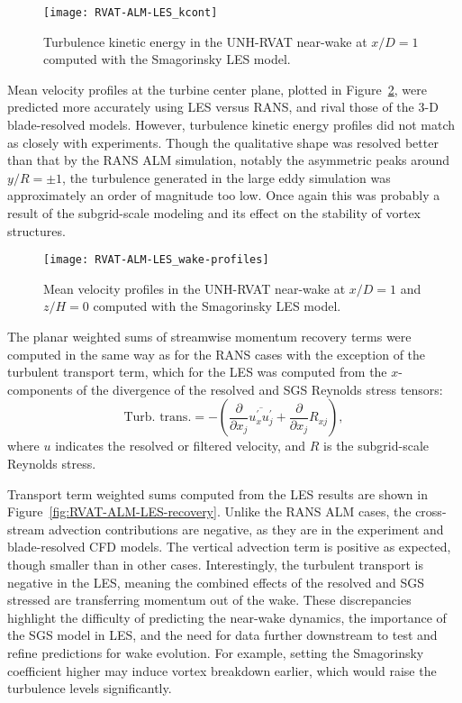 \begin{figure}
    \centering

    \texttt{[image: RVAT-ALM-LES\_kcont]}

    \caption{Turbulence kinetic energy in the UNH-RVAT near-wake at $x/D=1$
        computed with the Smagorinsky LES model.}

    \label{fig:RVAT-ALM-LES-kcont}
\end{figure}

Mean velocity profiles at the turbine center plane, plotted in
Figure~\ref{fig:RVAT-ALM-LES-profiles}, were predicted more accurately using LES
versus RANS, and rival those of the 3-D blade-resolved models. However,
turbulence kinetic energy profiles did not match as closely with experiments.
Though the qualitative shape was resolved better than that by the RANS ALM
simulation, notably the asymmetric peaks around $y/R = \pm 1$, the turbulence
generated in the large eddy simulation was approximately an order of magnitude
too low. Once again this was probably a result of the subgrid-scale modeling and
its effect on the stability of vortex structures.

\begin{figure}
    \centering

    \texttt{[image: RVAT-ALM-LES\_wake-profiles]}

    \caption{Mean velocity profiles in the UNH-RVAT near-wake at $x/D=1$ and
        $z/H=0$ computed with the Smagorinsky LES model.}

    \label{fig:RVAT-ALM-LES-profiles}
\end{figure}

The planar weighted sums of streamwise momentum recovery terms were computed in
the same way as for the RANS cases with the exception of the turbulent transport
term, which for the LES was computed from the $x$-components of the divergence
of the resolved and SGS Reynolds stress tensors:
\begin{equation}
    \text{Turb. trans.} = - \left( \frac{\partial}{\partial x_j}
    \overline{u^\prime_x u^\prime_j}
    + \frac{\partial}{\partial x_j} R_{xj}
    \right),
\end{equation}
where $u$ indicates the resolved or filtered velocity, and $R$ is the
subgrid-scale Reynolds stress.

Transport term weighted sums computed from the LES results are shown in
Figure~\ref{fig:RVAT-ALM-LES-recovery}. Unlike the RANS ALM cases, the
cross-stream advection contributions are negative, as they are in the experiment
and blade-resolved CFD models. The vertical advection term is positive as
expected, though smaller than in other cases. Interestingly, the turbulent
transport is negative in the LES, meaning the combined effects of the resolved
and SGS stressed are transferring momentum out of the wake. These discrepancies
highlight the difficulty of predicting the near-wake dynamics, the importance of
the SGS model in LES, and the need for data further downstream to test and
refine predictions for wake evolution. For example, setting the Smagorinsky
coefficient higher may induce vortex breakdown earlier, which would raise the
turbulence levels significantly.

